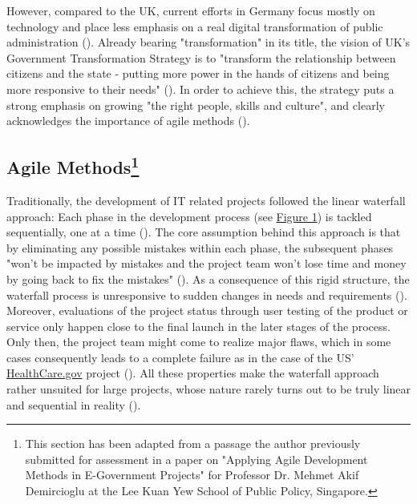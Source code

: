 However, compared to the UK, current efforts in Germany focus mostly on technology and place less emphasis on a real digital transformation of public administration (\cite{Mergel2019, EuropeanCommission2019b}). Already bearing "transformation" in its title, the vision of UK's Government Transformation Strategy is to "transform the relationship between citizens and the state - putting more power in the hands of citizens and being more responsive to their needs" (\cite{CabinetOffice2017}). In order to achieve this, the strategy puts a strong emphasis on growing "the right people, skills and culture", and clearly acknowledges the importance of agile methods (\cite{CabinetOffice2017}).\par 


\subsection[Agile Methods]{Agile Methods\footnote{This section has been adapted from a passage the author previously submitted for assessment in a paper on "Applying Agile Development Methods in E-Government Projects" for Professor Dr. Mehmet Akif Demircioglu at the Lee Kuan Yew School of Public Policy, Singapore.}}\label{Agile Methods}
\begin{wrapfigure}[8]{r}{0.5\textwidth}
	\centering
	\texttt{[image: \{"Latex/THESIS/Figures/Waterfall"]}.png}
	\caption[Waterfall development process]{Waterfall development process (adapted from \cite{Mergel2016})}
	\label{fig:Waterfall development}
\end{wrapfigure}
Traditionally, the development of IT related projects followed the linear waterfall approach: Each phase in the development process (see \hyperref[fig:Waterfall development]{Figure 1}) is tackled sequentially, one at a time (\cite{Kannan2014, Sherrell2013}). The core assumption behind this approach is that by eliminating any possible mistakes within each phase, the subsequent phases "won't be impacted by mistakes and the project team won't lose time and money by going back to fix the mistakes" (\cite[p. 517]{Mergel2016}). As a consequence of this rigid structure, the waterfall process is unresponsive to sudden changes in needs and requirements (\cite{Kannan2014}). Moreover, evaluations of the project status through user testing of the product or service only happen close to the final launch in the later stages of the process. Only then, the project team might come to realize major flaws, which in some cases consequently leads to a complete failure as in the case of the US' \href{www.healthcare.gov}{HealthCare.gov} project (\cite{Mergel2016}). All these properties make the waterfall approach rather unsuited for large projects, whose nature rarely turns out to be truly linear and sequential in reality (\cite{Kannan2014}).

